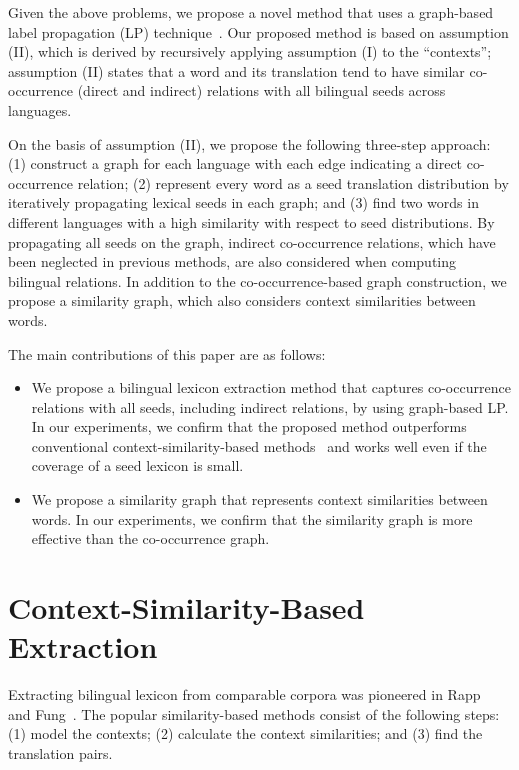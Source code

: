 \documentclass[english]{jnlp_1.4}
\begin{document}
Given the above problems, we propose a novel method that uses a graph-based label propagation (LP) technique~\cite{zhu02}. 
Our proposed method is based on assumption (II), which is derived by recursively applying assumption (I) to the ``contexts''; assumption (II) states that a word and its translation tend to have similar co-occurrence (direct and indirect) relations with all bilingual seeds across languages. 

On the basis of assumption (II), we propose the following three-step approach: (1) construct a graph for each language with each edge indicating a direct co-occurrence relation; (2) represent every word as a seed translation distribution by iteratively propagating lexical seeds in each graph; and (3) find two words in different languages with a high similarity with respect to seed distributions. 
By propagating all seeds on the graph, indirect co-occurrence relations, which have been neglected in previous methods, are also considered when computing bilingual relations. 
In addition to the co-occurrence-based graph construction, we propose a similarity graph, which also considers context similarities between words. 

The main contributions of this paper are as follows: 
\begin{itemize}
\item We propose a bilingual lexicon extraction method that captures co-occurrence relations with all seeds, including indirect relations, by using graph-based LP. In our experiments, we confirm that the proposed method outperforms conventional context-similarity-based methods~\cite{rapp99,andrade10} and works well even if the coverage of a seed lexicon is small. 
\item We propose a similarity graph that represents context similarities between words. In our experiments, we confirm that the similarity graph is more effective than the co-occurrence graph. 
\end{itemize}


\section{Context-Similarity-Based Extraction}
\label{sect:related}

Extracting bilingual lexicon from comparable corpora was pioneered in Rapp~\citeyear{rapp95} and Fung~\citeyear{fung95}. 
The popular similarity-based methods consist of the following steps: (1) model the contexts; (2) calculate the context similarities; and (3) find the translation pairs. 
\end{document}
